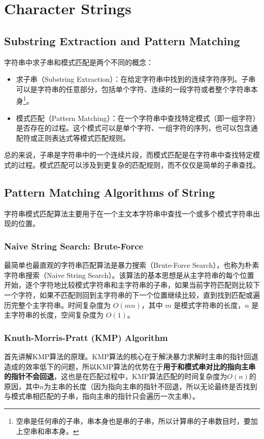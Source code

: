 \chapter{Character Strings}
\section{Substring Extraction and Pattern Matching}
字符串中求子串和模式匹配是两个不同的概念：

\begin{itemize}
    \item 求子串（Substring Extraction）：在给定字符串中找到的连续字符序列。子串可以是字符串的任意部分，包括单个字符、连续的一段字符或者整个字符串本身\footnote{空串是任何串的子串，串本身也是串的子串，所以计算串的子串数目时，要加上空串和串本身。}。
    \item 模式匹配（Pattern Matching）：在一个字符串中查找特定模式（即一组字符）是否存在的过程。这个模式可以是单个字符、一组字符的序列，也可以包含通配符或正则表达式等模式匹配规则。
\end{itemize}

总的来说，子串是字符串中的一个连续片段，而模式匹配是在字符串中查找特定模式的过程。模式匹配可以涉及到更复杂的匹配规则，而不仅仅是简单的子串查找。

\section{Pattern Matching Algorithms of String}
字符串模式匹配算法主要用于在一个主文本字符串中查找一个或多个模式字符串出现的位置。

\subsection{Naive String Search: Brute-Force}
最简单也最直观的字符串匹配算法是暴力搜索（Brute-Force Search），也称为朴素字符串搜索（Naive String Search）。该算法的基本思想是从主字符串的每个位置开始，逐个字符地比较模式字符串和主字符串的子串，如果当前字符匹配则比较下一个字符，如果不匹配则回到主字符串的下一个位置继续比较，直到找到匹配或遍历完整个主字符串。时间复杂度为 $O(mn)$，其中 $m$ 是模式字符串的长度，$n$ 是主字符串的长度，空间复杂度为 $O(1)$。

\subsection{Knuth-Morris-Pratt (KMP) Algorithm}
首先讲解KMP算法的原理。KMP算法的核心在于解决暴力求解时主串的指针回退造成的效率低下的问题，所以KMP算法的优势在于\textbf{用于和模式串对比的指向主串的指针不会回退}，这也是在匹配过程中，KMP算法匹配的时间复杂度为$O(n)$的原因，其中$n$为主串的长度（因为指向主串的指针不回退，所以无论最终是否找到与模式串相匹配的子串，指向主串的指针只会遍历一次主串）。

